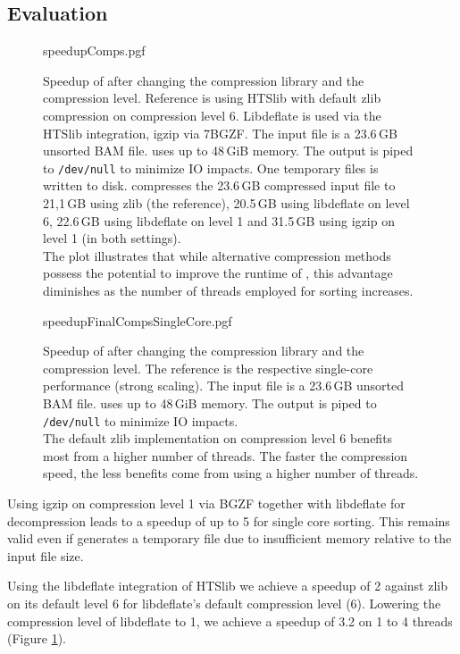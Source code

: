 \subsection{Evaluation}
\begin{figure}[h]
        {speedupComps.pgf}
    \caption{Speedup of \sort after changing the compression library and the compression level. Reference is \sort using HTSlib with default zlib compression on compression level 6. Libdeflate is used via the HTSlib integration, igzip via 7BGZF. The input file is a 23.6\,GB unsorted BAM file. \sort uses up to 48\,GiB memory. The output is piped to \texttt{/dev/null} to minimize IO impacts. One temporary files is written to disk. \sort compresses the 23.6\,GB compressed input file to 21,1\,GB using zlib (the reference), 20.5\,GB using libdeflate on level 6, 22.6\,GB using libdeflate on level 1 and 31.5\,GB using igzip on level 1 (in both settings). \parents \threads \points\\
    The plot illustrates that while alternative compression methods possess the potential to improve the runtime of \sort, this advantage diminishes as the number of threads employed for sorting increases.}
    \label{fig:speedupCompression}
\end{figure}
\begin{figure}[!h]
        {speedupFinalCompsSingleCore.pgf}
    \caption{Speedup of \sort after changing the compression library and the compression level. The reference is the respective single-core performance (strong scaling). The input file is a 23.6\,GB unsorted BAM file. \sort uses up to 48\,GiB memory. The output is piped to \texttt{/dev/null} to minimize IO impacts. \parents \threads \points\\
    The default zlib implementation on compression level 6 benefits most from a higher number of threads. The faster the compression speed, the less benefits come from using a higher number of threads.}
    \label{fig:speedupSingle}
\end{figure}
Using igzip on compression level 1 via BGZF together with libdeflate for decompression leads to a speedup of up to 5 for single core sorting. This remains valid even if \sort generates a temporary file due to insufficient memory relative to the input file size.

Using the libdeflate integration of HTSlib we achieve a speedup of 2 against zlib on its default level 6 for libdeflate's default compression level (6). Lowering the compression level of libdeflate to 1, we achieve a speedup of 3.2 on 1 to 4 threads (Figure \ref{fig:speedupCompression}).

